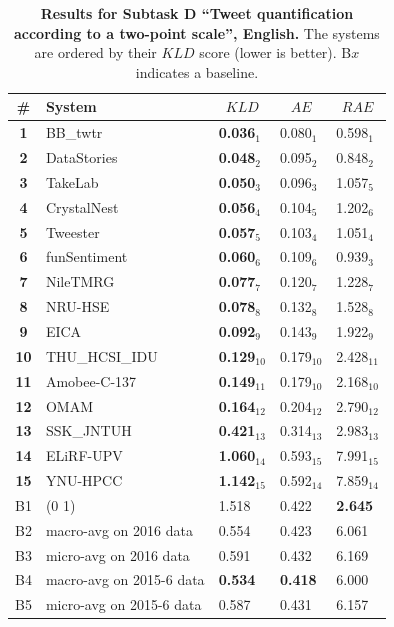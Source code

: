 \begin{table}[tbh]
\centering
\begin{small}
\renewcommand{\arraystretch}{1.0}%
\setlength{\tabcolsep}{2pt}
\begin{tabular}{|c|l|l|l|l|}
\hline
      \bf \# & \bf System & \multicolumn{1}{c|}{$KLD$} & \multicolumn{1}{c|}{$AE$} &\multicolumn{1}{c|}{$RAE$} \\
\hline
\bf 1 & BB\_twtr & \bf 0.036$_{1}$ & 0.080$_{1}$ & 0.598$_{1}$ \\
\bf 2 & DataStories & \bf 0.048$_{2}$ & 0.095$_{2}$ & 0.848$_{2}$ \\
\bf 3 & TakeLab & \bf 0.050$_{3}$ & 0.096$_{3}$ & 1.057$_{5}$ \\
\bf 4 & CrystalNest & \bf 0.056$_{4}$ & 0.104$_{5}$ & 1.202$_{6}$ \\
\bf 5 & Tweester & \bf 0.057$_{5}$ & 0.103$_{4}$ & 1.051$_{4}$ \\
\bf 6 & funSentiment & \bf 0.060$_{6}$ & 0.109$_{6}$ & 0.939$_{3}$ \\
\bf 7 & NileTMRG & \bf 0.077$_{7}$ & 0.120$_{7}$ & 1.228$_{7}$ \\
\bf 8 & NRU-HSE & \bf 0.078$_{8}$ & 0.132$_{8}$ & 1.528$_{8}$ \\
\bf 9 & EICA & \bf 0.092$_{9}$ & 0.143$_{9}$ & 1.922$_{9}$ \\
\bf 10 & THU\_HCSI\_IDU & \bf 0.129$_{10}$ & 0.179$_{10}$ & 2.428$_{11}$ \\
\bf 11 & Amobee-C-137 & \bf 0.149$_{11}$ & 0.179$_{10}$ & 2.168$_{10}$ \\
\bf 12 & OMAM & \bf 0.164$_{12}$ & 0.204$_{12}$ & 2.790$_{12}$ \\
\bf 13 & SSK\_JNTUH & \bf 0.421$_{13}$ & 0.314$_{13}$ & 2.983$_{13}$ \\
\bf 14 & ELiRF-UPV & \bf 1.060$_{14}$ & 0.593$_{15}$ & 7.991$_{15}$ \\
\bf 15 & YNU-HPCC & \bf 1.142$_{15}$ & 0.592$_{14}$ & 7.859$_{14}$ \\
\hline
B1 & (0 1) & 1.518 & 0.422 & \bf 2.645\\
B2 & macro-avg on 2016 data & 0.554 & 0.423 & 6.061\\
B3 & micro-avg on 2016 data & 0.591 & 0.432 & 6.169\\
B4 & macro-avg on 2015-6 data & \bf 0.534 & \bf 0.418 & 6.000\\
B5 & micro-avg on 2015-6 data & 0.587 & 0.431 & 6.157\\
\hline
\end{tabular}
\caption{\textbf{Results for Subtask D ``Tweet quantification according to a two-point scale'', English.} The systems are ordered by their $KLD$ score (lower is better). B$x$ indicates a baseline.}
\label{table:ResultsSubtaskD:English}
\end{small}
\end{table}
